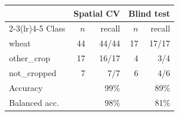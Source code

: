 \begin{tabular}{lrrrr}
\toprule
 & \multicolumn{2}{c}{Spatial CV} & \multicolumn{2}{c}{Blind test} \\
\cmidrule(lr){2-3}\cmidrule(lr){4-5}
Class & $n$ & recall & $n$ & recall \\
\midrule
wheat & 44 & 44/44 & 17 & 17/17 \\
other\_crop & 17 & 16/17 & 4 & 3/4 \\
not\_cropped & 7 & 7/7 & 6 & 4/6 \\
\midrule
Accuracy & & 99\% & & 89\% \\
Balanced acc. & & 98\% & & 81\% \\
\bottomrule
\end{tabular}
